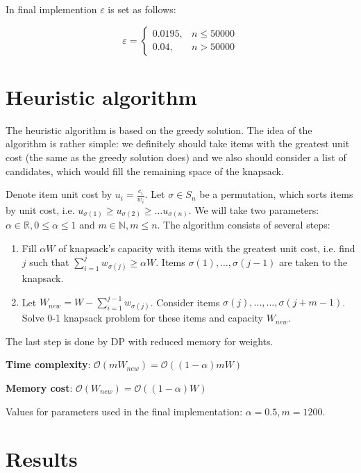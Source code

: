 \documentclass{article}
\begin{document}
In final implemention $\varepsilon$ is set as follows:

$$
\varepsilon = 
\begin{cases}
    0.0195, & n \le 50000 \\
    0.04, & n > 50000
\end{cases}
$$

\section{Heuristic algorithm}

The heuristic algorithm is based on the greedy solution. The idea of the algorithm is rather simple: we definitely should take items with the greatest unit cost (the same as the greedy solution does) and we also should consider a list of candidates, which would fill the remaining space of the knapsack.

Denote item unit cost by $u_i = \frac{c_i}{w_i}$. Let $\sigma \in S_n$ be a permutation, which sorts items by unit cost, i.e. $u_{\sigma(1)} \ge u_{\sigma(2)} \ge \dots u_{\sigma(n)}$. We will take two parameters: $\alpha \in \mathbb{R}, 0 \le \alpha \le 1 $ and $m \in \mathbb{N}, m \le n $. The algorithm consists of several steps:

\begin{enumerate}
    \item Fill $\alpha W$ of knapsack's capacity with items with the greatest unit cost, i.e. find $j$ such that $\sum_{i = 1}^j w_{\sigma(j)} \ge \alpha W$. Items $\sigma(1), \dots, \sigma(j - 1)$ are taken to the knapsack.
    \item Let $W_{new} = W - \sum_{i = 1}^{j - 1} w_{\sigma(j)}$. Consider items $\sigma(j), \dots, ..., \sigma(j + m -1)$. Solve 0-1 knapsack problem for these items and capacity $W_{new}$.
\end{enumerate}{}

The last step is done by DP with reduced memory for weights.

\textbf{Time complexity}: $\mathcal{O}\left(m W_{new}\right) = \mathcal{O}\left((1 - \alpha) m W\right)$

\textbf{Memory cost}: $\mathcal{O}\left(W_{new}\right) = \mathcal{O}\left((1 - \alpha)W\right)$

\vspace{0.3cm}

Values for parameters used in the final implementation: $\alpha = 0.5, m = 1200$.

\section{Results}
\end{document}
